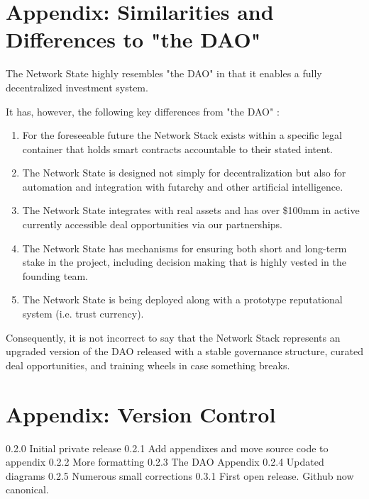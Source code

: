 \documentclass{article}
\begin{document}
\section { Appendix: Similarities and Differences to "the DAO"}


The Network State highly resembles "the DAO" in that it enables a fully decentralized investment system.

It has, however, the following key differences from "the DAO" :
\begin{enumerate}

\item For the foreseeable future the Network Stack exists within a specific legal container that holds smart contracts accountable to their stated intent.

\item The Network State is designed not simply for decentralization but also for automation and integration with futarchy and other artificial intelligence.

\item The Network State integrates with real assets and has over \$100mm in active currently accessible deal opportunities via our partnerships.

\item The Network State has mechanisms for ensuring both short and long-term stake in the project, including decision making that is highly vested in the founding team.

\item The Network State is being deployed along with a prototype reputational system (i.e. trust currency).

\end{enumerate}

Consequently, it is not incorrect to say that the Network Stack represents an upgraded version of the DAO released with a stable governance structure, curated deal opportunities, and training wheels in case something breaks.


\section { Appendix: Version Control}

0.2.0 Initial private release
0.2.1 Add appendixes and move source code to appendix
0.2.2 More formatting
0.2.3 The DAO Appendix
0.2.4 Updated diagrams
0.2.5 Numerous small corrections
0.3.1 First open release. Github now canonical. 
\end{document}
